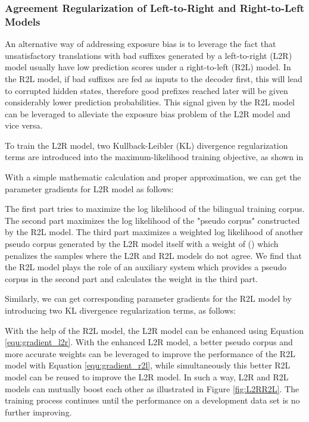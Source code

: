 \documentclass[a4paper]{article}
\begin{document}
\begin{CJK*}{UTF8}{gbsn}
\subsubsection{Agreement Regularization of Left-to-Right and Right-to-Left Models}
\label{sec-l2r-r2l}
An alternative way of addressing exposure bias is to leverage the fact that
unsatisfactory translations with bad suffixes generated by a left-to-right (L2R) model usually have low prediction scores under a right-to-left (R2L) model.
In the R2L model, if bad suffixes are fed as inputs to the decoder first, this will lead to corrupted hidden states, therefore good prefixes reached later will be given considerably lower prediction probabilities. This signal given by the R2L model can be leveraged to alleviate the exposure bias problem of the L2R model and vice versa.

To train the L2R model, two Kullback-Leibler (KL) divergence regularization terms are introduced into the maximum-likelihood training objective, as shown in





With a simple mathematic calculation and proper approximation, we can get the parameter gradients for L2R model as follows:

The first part tries to maximize the log likelihood of the bilingual training corpus. The second part maximizes the log likelihood of the "pseudo corpus"  constructed by the R2L model. The third part maximizes a weighted log likelihood of another pseudo corpus generated by the L2R model itself with a weight of () which penalizes the samples where the L2R and R2L models do not agree. We find that the R2L model plays the role of an auxiliary system which provides a pseudo corpus in the second part and calculates the weight in the third part.

Similarly, we can get corresponding parameter gradients for the R2L model by introducing two KL divergence regularization terms, as follows:





With the help of the R2L model, the L2R model can be enhanced using Equation \ref{equ:gradient_l2r}. With the enhanced L2R model, a better pseudo corpus and more accurate weights can be leveraged to improve the performance of the R2L model with Equation \ref{equ:gradient_r2l}, while simultaneously this better R2L model can be reused to improve the L2R model. In such a way, L2R and R2L models can mutually boost each other as illustrated in Figure \ref{fig:L2RR2L}. The training process continues until the performance on a development data set is no further improving.






\end{CJK*}
\end{document}
